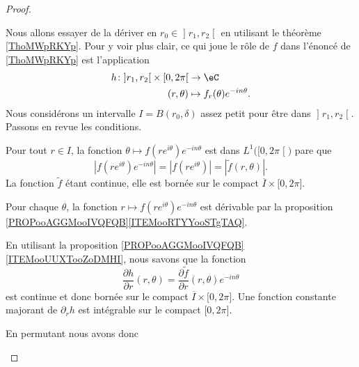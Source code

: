 \begin{proof}
\begin{subproof}
			\item[Permuter dérivée et intégrale]
			Nous allons essayer de la dériver en \( r_0\in \mathopen] r_1 , r_2 \mathclose[\) en utilisant le théorème \ref{ThoMWpRKYp}. Pour y voir plus clair, ce qui joue le rôle de \( f\) dans l'énoncé de \ref{ThoMWpRKYp} est l'application
			\begin{equation}
				\begin{aligned}
					h\colon \mathopen] r_1 , r_2 \mathclose[\times \mathopen[ 0 , 2\pi \mathclose[ & \to \eC                             \\
					(r,\theta)                                                                     & \mapsto  f_r(\theta) e^{-in\theta}.
				\end{aligned}
			\end{equation}
			Nous considérons un intervalle \( I=B(r_0,\delta)\) assez petit pour être dans \( \mathopen] r_1 , r_2 \mathclose[\). Passons en revue les conditions.
			\begin{subproof}
				\item[Pour \ref{ITEMooAFVMooAeCEco}]
				Pour tout \( r\in I\), la fonction \( \theta\mapsto f(r e^{i\theta}) e^{-in\theta}\) est dans \( L^1\big( \mathopen[ 0 , 2\pi \mathclose[ \big)\) pare que
				\begin{equation}
					| f(r e^{i\theta}) e^{-in\theta} |=| f(r e^{i\theta}) |=| \tilde f(r,\theta) |.
				\end{equation}
				La fonction \( \tilde f\) étant continue, elle est bornée sur le compact \( \overline{ I }\times \mathopen[ 0 , 2\pi \mathclose]\).
				\item[Pour \ref{ITEMooXIZXooGPYFyT}]
				Pour chaque \( \theta\), la fonction \( r\mapsto f(r e^{i\theta}) e^{-in\theta}\) est dérivable par la proposition \ref{PROPooAGGMooIVQFQB}\ref{ITEMooRTYYooSTgTAQ}.
				\item[Pour \ref{ITEMooDTTIooWkldfB}]
				En utilisant la proposition \ref{PROPooAGGMooIVQFQB}\ref{ITEMooUUXTooZoDMHI}, nous savons que la fonction
				\begin{equation}
					\frac{ \partial h }{ \partial r  }(r,\theta)=\frac{ \partial \tilde f }{ \partial r }(r,\theta) e^{-in\theta}
				\end{equation}
				est continue et donc bornée sur le compact \( \overline{ I }\times \mathopen[ 0 , 2\pi \mathclose]\). Une fonction constante majorant de \( \partial_rh\) est intégrable sur le compact \( \mathopen[ 0 , 2\pi \mathclose]\).
			\end{subproof}
			En permutant nous avons donc

\end{subproof}
\end{proof}
